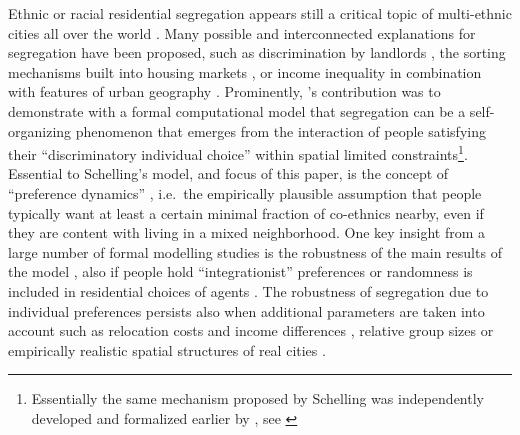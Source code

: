 \documentclass[
]{article}
\begin{document}
Ethnic or racial residential segregation appears still a critical topic
of multi-ethnic cities all over the world \citep{charles2003dynamics}.
Many possible and interconnected explanations for segregation have been
proposed, such as discrimination by landlords
\citep{ahmed2008discrimination}, the sorting mechanisms built into
housing markets \citep{bailey2012spatial}, or income inequality in
combination with features of urban geography
\citep{pais2017intergenerational}. Prominently,
\cite{schelling1969models,schelling1971dynamic}'s contribution was to
demonstrate with a formal computational model that segregation can be a
self-organizing phenomenon that emerges from the interaction of people
satisfying their ``discriminatory individual choice''
\citep[p. 488]{schelling1969models} within spatial limited
constraints\footnote{Essentially the same mechanism proposed by Schelling was independently developed and formalized earlier by \cite{sakoda1971checkerboard}, see \cite{hegselmann2017thomas}}.
Essential to Schelling's model, and focus of this paper, is the concept
of ``preference dynamics'' \citep{clark2008understanding}, i.e.~the
empirically plausible assumption that people typically want at least a
certain minimal fraction of co-ethnics nearby, even if they are content
with living in a mixed neighborhood. One key insight from a large number
of formal modelling studies is the robustness of the main results of the
model \citep{flache2020analytical}, also if people hold
``integrationist'' preferences \citep{zhang2004} or randomness is
included in residential choices of agents
\citep{bruch2006neighborhood,van2009neighborhood,bruch2009preferences}.
The robustness of segregation due to individual preferences persists
also when additional parameters are taken into account such as
relocation costs and income differences \citep{fossett2006ethnic},
relative group sizes \citep{bruch2014population} or empirically
realistic spatial structures of real cities
\citep{benenson2009schelling}.
\end{document}
